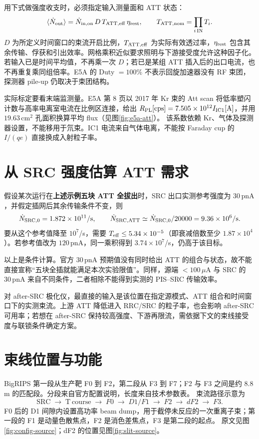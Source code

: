 \documentclass[UTF8,11pt,a4paper]{ctexart}
\begin{document}
用下式做强度收支时，必须指定输入测量面和 ATT 状态：
\[
\langle\dot N_{\rm out}\rangle
=\dot N_{\rm in,on}\,D\,T_{\rm ATT,eff}\,\eta_{\rm rest},
\qquad T_{\rm ATT,nom}=\prod_{i\,\mathrm{IN}}T_i.
\]
$D$ 为所定义时间窗口的束流开启比例，$T_{\rm ATT,eff}$ 为实际有效透过率，$\eta_{\rm rest}$ 包含其余传输、俘获和引出效率。网格乘积近似要求照明与下游接受度允许这种因子化。若输入已是时间平均值，不再乘一次 $D$；若已是某组 ATT 插入后的出口电流，也不再重复乘同组倍率。E5A 的 Duty $=100\%$ 不表示回旋加速器没有 RF 束团，探测器 pile-up 仍取决于束团结构。

实际标定要看末端监测量。E5A 第 8 页以 2017 年 Kr 束的 Att scan 将低率塑闪计数与高率电离室电流在比例区连接，给出 $R_{\rm PL}[\mathrm{cps}]=7.505\times10^{12}I_{\rm IC1}[\mathrm A]$，并用 $19.63\,\mathrm{cm^2}$ 孔面积换算平均 flux（见图\ref{fig:e5a-att}）。\cite{e5a} 该系数依赖 Kr、气体及探测器设置，不能移用于氘束。IC1 电流来自气体电离，不能按 Faraday cup 的 $I/(qe)$ 直接换成入射粒子率。

\section{从 SRC 强度估算 ATT 需求}
\label{sec:att-budget}
假设某次运行在\textbf{上述示例五块 ATT 全拔出}时，SRC 出口实测参考强度为 $30\,\mathrm{pnA}$，并假定插网后其余传输条件不变，则
\[
\dot N_{\rm SRC,0}=1.872\times10^{11}/\mathrm s,
\qquad
\dot N_{\rm SRC,ATT}\simeq\dot N_{\rm SRC,0}/20000
=9.36\times10^6/\mathrm s.
\]
要从这个参考值降至 $10^7$/s，需要 $T_{\rm eff}\leq5.34\times10^{-5}$（即衰减倍数至少 $1.87\times10^4$）。若参考值改为 $120\,\mathrm{pnA}$，同一乘积得到 $3.74\times10^7$/s，仍高于该目标。

以上是条件计算。官方 $30\,\mathrm{pnA}$ 预期值没有同时给出 ATT 的组合与状态，故不能直接宣称“五块全插就能满足本次实验限值”。同样，源端 $<100\,\mu\mathrm A$ 与 SRC 的 $30\,\mathrm{pnA}$ 来自不同条件，二者相除不能得到实测的 PIS--SRC 传输效率。

对 after-SRC 极化仪，最直接的输入是该位置在指定源模式、ATT 组合和时间窗口下的实测束流。上游 ATT 降低进入 RRC/SRC 的粒子率，也会影响 after-SRC 可用率；若想在 after-SRC 保持较高强度、下游再限流，需依据下文的束线接受度与联锁条件确定方案。

\section{束线位置与功能}

BigRIPS 第一段从生产靶 F0 到 F2，第二段从 F3 到 F7；F2 与 F3 之间是约 8.8 m 的匹配段。分段来自官方配置说明，长度来自技术参数表。\cite{bigrips-config,bigrips-technical} 束流路径示意为
\[
\mathrm{SRC}\;\longrightarrow\;\mathrm{T\ course}\;\longrightarrow\;F0\;\longrightarrow\;D1/F1\;\longrightarrow\;F2\;\longrightarrow\;dF2\;\longrightarrow\;F3.
\]
F0 后的 D1 间隙内设置高功率 beam dump，用于截停未反应的一次重离子束；第一段的 F1 是动量色散焦点，F2 是消色差焦点，F3 是第二段的起点。\cite{bigrips-config} 原文见图\ref{fig:config-source}；dF2 的位置见图\ref{fig:slit-source}。
\end{document}
